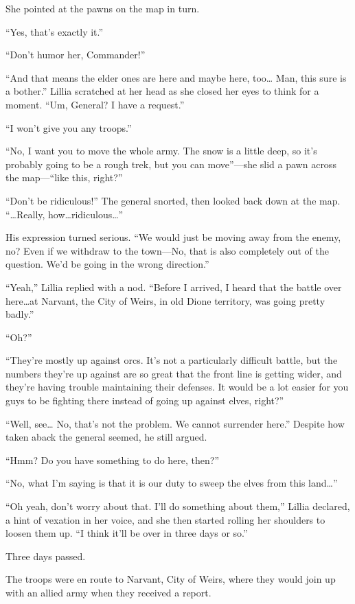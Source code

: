 She pointed at the pawns on the map in turn.

“Yes, that’s exactly it.”

“Don’t humor her, Commander!”

“And that means the elder ones are here and maybe here, too… Man, this sure is a bother.” Lillia scratched at her head as she closed her eyes to think for a moment. “Um, General? I have a request.”

“I won’t give you any troops.”

“No, I want you to move the whole army. The snow is a little deep, so it’s probably going to be a rough trek, but you can move”—she slid a pawn across the map—“like this, right?”

“Don’t be ridiculous!” The general snorted, then looked back down at the map. “…Really, how…ridiculous…”

His expression turned serious. “We would just be moving away from the enemy, no? Even if we withdraw to the town—No, that is also completely out of the question. We’d be going in the wrong direction.”

“Yeah,” Lillia replied with a nod. “Before I arrived, I heard that the battle over here…at Narvant, the City of Weirs, in old Dione territory, was going pretty badly.”

“Oh?”

“They’re mostly up against orcs. It’s not a particularly difficult battle, but the numbers they’re up against are so great that the front line is getting wider, and they’re having trouble maintaining their defenses. It would be a lot easier for you guys to be fighting there instead of going up against elves, right?”

“Well, see… No, that’s not the problem. We cannot surrender here.” Despite how taken aback the general seemed, he still argued.

“Hmm? Do you have something to do here, then?”

“No, what I’m saying is that it is our duty to sweep the elves from this land…”

“Oh yeah, don’t worry about that. I’ll do something about them,” Lillia declared, a hint of vexation in her voice, and she then started rolling her shoulders to loosen them up. “I think it’ll be over in three days or so.”

\icon

Three days passed.

The troops were en route to Narvant, City of Weirs, where they would join up with an allied army when they received a report.

